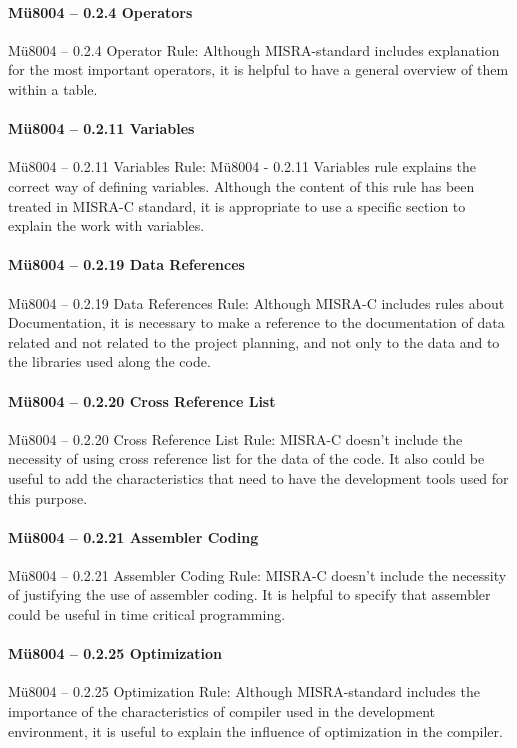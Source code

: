 \paragraph{Mü8004 – 0.2.4 Operators}
Mü8004 – 0.2.4 Operator Rule: Although MISRA-standard includes explanation for the most important operators, it is helpful to have a general overview of them within a table.

\paragraph{Mü8004 – 0.2.11 Variables}
Mü8004 – 0.2.11 Variables Rule: Mü8004 - 0.2.11 Variables rule explains the correct way of defining variables. Although the content of this rule has been treated in MISRA-C standard, it is appropriate to use a specific section to explain the work with variables.

\paragraph{Mü8004 – 0.2.19 Data References}
Mü8004 – 0.2.19 Data References Rule: Although MISRA-C includes rules about Documentation, it is necessary to make a reference to the documentation of data related and not related to the project planning, and not only to the data and to the libraries used along the code.

\paragraph{Mü8004 – 0.2.20 Cross Reference List}
Mü8004 – 0.2.20 Cross Reference List Rule: MISRA-C doesn’t include the necessity of using cross reference list for the data of the code. It also could be useful to add the characteristics that need to have the development tools used for this purpose.

\paragraph{Mü8004 – 0.2.21 Assembler Coding}
Mü8004 – 0.2.21 Assembler Coding Rule: MISRA-C doesn’t include the necessity of justifying the use of assembler coding. It is helpful to specify that assembler could be useful in time critical programming.

\paragraph{Mü8004 – 0.2.25 Optimization}
Mü8004 – 0.2.25 Optimization Rule: Although MISRA-standard includes the importance of the characteristics of compiler used in the development environment, it is useful to explain the influence of optimization in the compiler.

